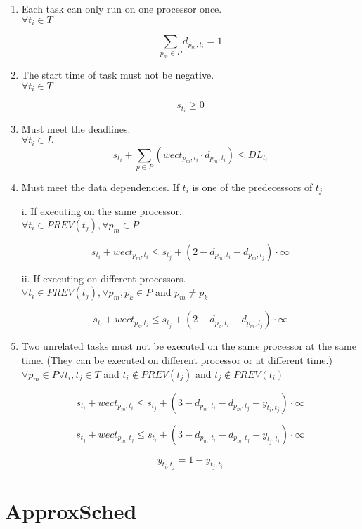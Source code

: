 \documentclass{article}
\begin{document}
\begin{enumerate}[1. ]

\item Each task can only run on one processor once.\\
$ \forall t_i \in T $

$$
\sum_{p_m \in P} d_{p_m,t_i} = 1
$$

\item The start time of task must not be negative.\\
$ \forall t_i \in T $

$$
s_{t_i} \ge 0
$$

\item Must meet the deadlines.\\
$ \forall t_i \in L $
$$
s_{t_i} + \sum_{p \in P} (wect_{p_m, t_i} \cdot d_{p_m, t_i}) \le DL_{t_i}
$$

\item Must meet the data dependencies. If $t_i$ is one of the predecessors of $t_j$

i. If executing on the same processor.\\
$ \forall t_i \in PREV(t_j) , \forall p_m \in P$

$$
s_{t_i} + wect_{p_m, t_i} \le s_{t_j} + (2 - d_{p_m, t_i} - d_{p_m, t_j}) \cdot \infty
$$

ii. If executing on different processors.\\
$ \forall t_i \in PREV(t_j) , \forall p_m, p_k \in P $ and $ p_m \neq p_k $

$$
s_{t_i} + wect_{p_k, t_i} \le s_{t_j} + (2 - d_{p_k, t_i} - d_{p_m, t_j}) \cdot \infty
$$

\item Two unrelated tasks must not be executed on the same processor at the same time. (They can be executed on different processor or at different time.)\\
$ \forall p_m \in P \forall t_i, t_j \in T $ and $ t_i \notin PREV(t_j) $ and $ t_j \notin PREV(t_i) $

$$
s_{t_i} + wect_{p_m, t_i} \le s_{t_j} + (3 - d_{p_m, t_i} - d_{p_m, t_j} - y_{t_i, t_j}) \cdot \infty
$$

$$
s_{t_j} + wect_{p_m, t_j} \le s_{t_i} + (3 - d_{p_m, t_i} - d_{p_m, t_j} - y_{t_j, t_i}) \cdot \infty
$$

$$
    y_{t_i, t_j} = 1 - y_{t_j, t_i}
$$

\end{enumerate}

\section{ApproxSched}
\end{document}
